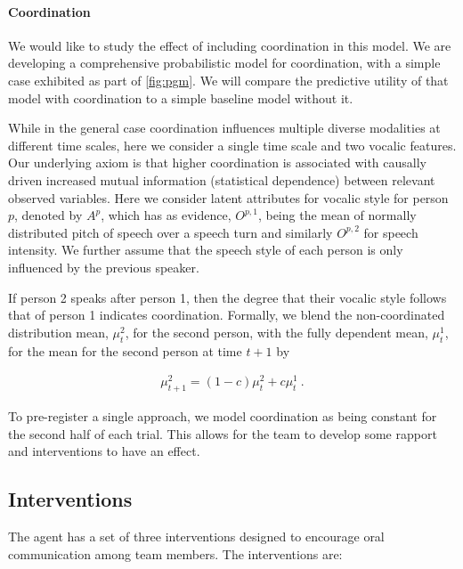     \paragraph{Coordination} We would like to study the effect of including
    coordination in this model.  We are developing a comprehensive
    probabilistic model for coordination, with a simple case exhibited as part
    of \autoref{fig:pgm}.  We will compare the predictive utility of that model
    with coordination to a simple baseline model without it.

    While in the general case coordination influences multiple diverse
    modalities at different time scales, here we consider a single time scale
    and two vocalic features.  Our underlying axiom is that higher coordination
    is associated with causally driven increased mutual information (statistical
    dependence) between relevant observed variables. Here we consider latent
    attributes for vocalic style for person $p$, denoted by $A^{p}$, which has
    as evidence, $O^{p,1}$, being the mean of normally distributed pitch of
    speech over a speech turn and similarly $O^{p,2}$ for speech intensity.  We
    further assume that the speech style of each person is only influenced by
    the previous speaker.

    If person 2 speaks after person 1, then the degree that their vocalic style
    follows that of person 1 indicates coordination. Formally, we blend the
    non-coordinated distribution mean, $\mu^2_t$, for the second person, with
    the fully dependent mean, $\mu^1_t$, for the mean for the second person at
    time $t+1$ by

    \begin{align}
        \mu^2_{t+1} = (1-c) \mu^2_t + c\mu^1_t ~.
    \end{align}

    To pre-register a single approach, we model coordination as being constant
    for the second half of each trial. This allows for the team to develop some
    rapport and interventions to have an effect. 

\clearpage
\subsection{Interventions}
\label{subsec:interventions}

The agent has a set of three interventions designed to encourage oral
communication among team members. The interventions are:

